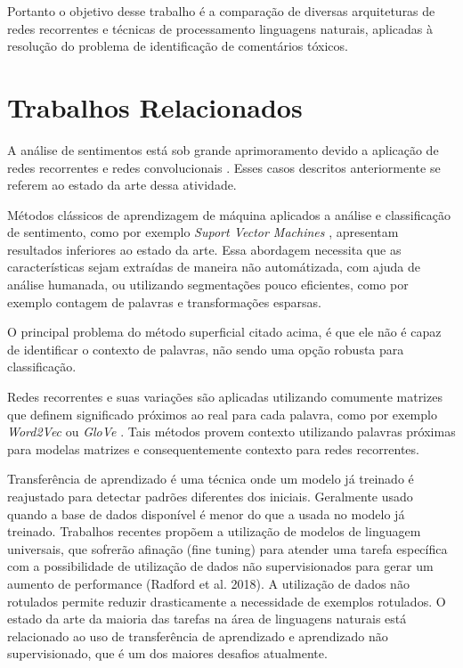 \documentclass[12pt]{article}
\begin{document}
Portanto o objetivo desse trabalho é a comparação de diversas arquiteturas de redes recorrentes e técnicas de processamento linguagens naturais, aplicadas à resolução do problema de identificação de comentários tóxicos.

\section{Trabalhos Relacionados} \label{sec:relacionado}

A análise de sentimentos está sob grande aprimoramento devido a aplicação de redes recorrentes \cite{karpathy:2015} e redes convolucionais \cite{lecun:98}. Esses casos descritos anteriormente se referem ao estado da arte dessa atividade.

Métodos clássicos de aprendizagem de máquina aplicados a análise e classificação de sentimento, como por exemplo \textit{Suport Vector Machines} \cite{DBLP:journals/ml/CortesV95}, apresentam resultados inferiores ao estado da arte. Essa abordagem necessita que as características sejam extraídas de maneira não automátizada, com ajuda de análise humanada, ou utilizando segmentações pouco eficientes, como por exemplo contagem de palavras e transformações esparsas.

O principal problema do método superficial citado acima, é que ele não é capaz de identificar o contexto de palavras, não sendo uma opção robusta para classificação.

Redes recorrentes e suas variações são aplicadas utilizando comumente matrizes que definem significado próximos ao real para cada palavra, como por exemplo \textit{Word2Vec} \cite{DBLP:journals/corr/abs-1301-3781} ou \textit{GloVe} \cite{pennington2014glove}. Tais métodos provem contexto utilizando palavras próximas para modelas matrizes e consequentemente contexto para redes recorrentes.

Transferência de aprendizado é uma técnica onde um modelo já treinado é reajustado para detectar padrões diferentes dos iniciais. Geralmente usado quando a base de dados disponível é menor do que a usada no modelo já treinado. Trabalhos recentes propõem a utilização de modelos de linguagem universais, que sofrerão afinação (fine tuning) para atender uma tarefa específica \cite{DBLP:journals/corr/abs-1801-06146} com a possibilidade de utilização de dados não supervisionados para gerar um aumento de performance (Radford et al. 2018). A utilização de dados não rotulados permite reduzir drasticamente a necessidade de exemplos rotulados. O estado da arte da maioria das tarefas na área de linguagens naturais está relacionado ao uso de transferência de aprendizado e aprendizado não supervisionado, que é um dos maiores desafios atualmente.
\end{document}
